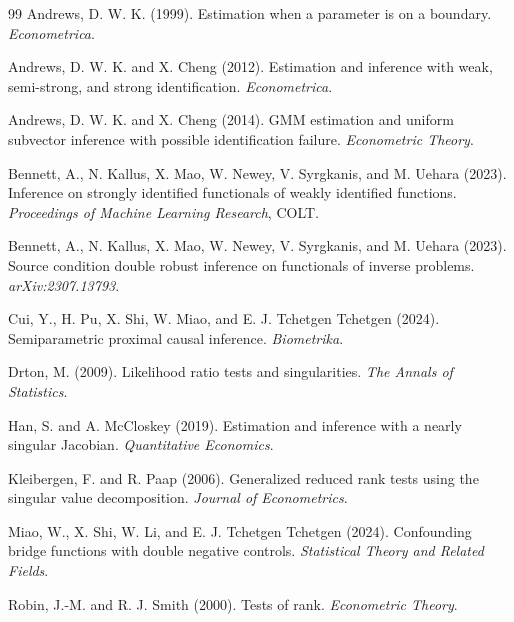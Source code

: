 \documentclass[11pt]{article}
\theoremstyle{definition}
\theoremstyle{plain}
\theoremstyle{remark}
\begin{document}
\begin{thebibliography}{99}
Andrews, D. W. K. (1999).
Estimation when a parameter is on a boundary.
\emph{Econometrica}.

Andrews, D. W. K. and X. Cheng (2012).
Estimation and inference with weak, semi-strong, and strong identification.
\emph{Econometrica}.

Andrews, D. W. K. and X. Cheng (2014).
GMM estimation and uniform subvector inference with possible identification failure.
\emph{Econometric Theory}.

Bennett, A., N. Kallus, X. Mao, W. Newey, V. Syrgkanis, and M. Uehara (2023).
Inference on strongly identified functionals of weakly identified functions.
\emph{Proceedings of Machine Learning Research}, COLT.

Bennett, A., N. Kallus, X. Mao, W. Newey, V. Syrgkanis, and M. Uehara (2023).
Source condition double robust inference on functionals of inverse problems.
\emph{arXiv:2307.13793}.

Cui, Y., H. Pu, X. Shi, W. Miao, and E. J. Tchetgen Tchetgen (2024).
Semiparametric proximal causal inference.
\emph{Biometrika}.

Drton, M. (2009).
Likelihood ratio tests and singularities.
\emph{The Annals of Statistics}.

Han, S. and A. McCloskey (2019).
Estimation and inference with a nearly singular Jacobian.
\emph{Quantitative Economics}.

Kleibergen, F. and R. Paap (2006).
Generalized reduced rank tests using the singular value decomposition.
\emph{Journal of Econometrics}.

Miao, W., X. Shi, W. Li, and E. J. Tchetgen Tchetgen (2024).
Confounding bridge functions with double negative controls.
\emph{Statistical Theory and Related Fields}.

Robin, J.-M. and R. J. Smith (2000).
Tests of rank.
\emph{Econometric Theory}.


\end{thebibliography}
\end{document}
